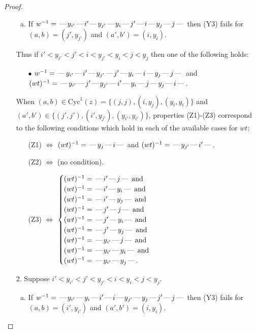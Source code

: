 \documentclass[10pt]{article}
\theoremstyle{definition}
\theoremstyle{definition}
\def\dash{\text{\hspace{0.5mm}---\hspace{0.5mm}}}
\def\Cyc{\mathrm{Cyc}}
\begin{document}
\begin{proof}
\begin{enumerate}
\begin{enumerate}[(a)]
\item If $w^{-1} = \dash y_{i'}\dash i'\dash y_{j'}\dash y_i\dash j'\dash i\dash y_j\dash j\dash $ then (Y3) fails for $(a,b)=(j',y_{j'})$ and $(a',b')=(i,y_i)$.
\end{enumerate}
Thus if $i' < y_{i'} < j' < i < y_{j'} < y_i < j < y_j$ then one of the following holds:
\begin{enumerate}
\item[$\bullet$] $w^{-1} = \dash y_{i'}\dash i'\dash y_{j'}\dash j'\dash y_i\dash i\dash y_j\dash j\dash $ and $(wt)^{-1} = \dash y_{i'}\dash j'\dash y_{j'}\dash i'\dash y_i\dash j\dash y_j\dash i\dash $.
\end{enumerate}
When $(a,b)\in\Cyc^1(z)=\{(j,j),(i,y_j),(y_i,y_i)\}$ and $(a',b')\in\{(j',j'),(i',y_{j'}),(y_{i'},y_{i'})\}$,
properties (Z1)-(Z3) correspond to the following conditions which
hold in each of the available cases for $wt$:
\begin{enumerate}
\item[](Z1) $\Leftrightarrow$ $(wt)^{-1} = \dash y_j \dash i \dash$  and $(wt)^{-1} = \dash y_{j'} \dash i' \dash$.
\item[](Z2) $\Leftrightarrow$ (no condition).
\item[](Z3) $\Leftrightarrow$ $\begin{cases}\text{$(wt)^{-1} = \dash i' \dash j \dash$}\text{ and }\\
\text{$(wt)^{-1} = \dash i' \dash y_i \dash$}\text{ and }\\
\text{$(wt)^{-1} = \dash i' \dash y_j \dash$}\text{ and }\\
\text{$(wt)^{-1} = \dash j' \dash j \dash$}\text{ and }\\
\text{$(wt)^{-1} = \dash j' \dash y_i \dash$}\text{ and }\\
\text{$(wt)^{-1} = \dash j' \dash y_j \dash$}\text{ and }\\
\text{$(wt)^{-1} = \dash y_{i'} \dash j \dash$}\text{ and }\\
\text{$(wt)^{-1} = \dash y_{i'} \dash y_i \dash$}\text{ and }\\
\text{$(wt)^{-1} = \dash y_{i'} \dash y_j \dash$}.\end{cases}$
\end{enumerate}
\item[$2$.] Suppose $i' < y_{i'} < j' < y_{j'} < i < y_i < j < y_j$.
\begin{enumerate}[(a)]
\item If $w^{-1} = \dash y_{i'}\dash y_i\dash i'\dash i\dash y_{j'}\dash y_j\dash j'\dash j\dash $ then (Y3) fails for $(a,b)=(i',y_{i'})$ and $(a',b')=(i,y_i)$.

\end{enumerate}
\end{enumerate}
\end{proof}
\end{document}
